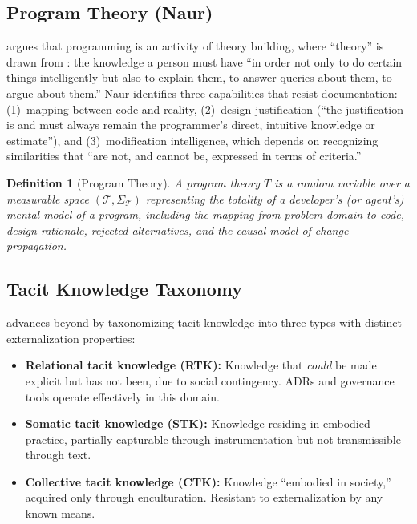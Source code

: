 \documentclass[11pt, a4paper, logo, copyright]{googledeepmind}
\newtheorem{definition}{Definition}[section]
\begin{document}
\subsection{Program Theory (Naur)}

\citet{naur1985} argues that programming is an activity of theory building, where ``theory'' is drawn from \citet{ryle1949}: the knowledge a person must have ``in order not only to do certain things intelligently but also to explain them, to answer queries about them, to argue about them.'' Naur identifies three capabilities that resist documentation: (1)~mapping between code and reality, (2)~design justification (``the justification is and must always remain the programmer's direct, intuitive knowledge or estimate''), and (3)~modification intelligence, which depends on recognizing similarities that ``are not, and cannot be, expressed in terms of criteria.''

\begin{definition}[Program Theory]
\label{def:theory}
A \emph{program theory} $T$ is a random variable over a measurable space $(\mathcal{T}, \Sigma_{\mathcal{T}})$ representing the totality of a developer's (or agent's) mental model of a program, including the mapping from problem domain to code, design rationale, rejected alternatives, and the causal model of change propagation.
\end{definition}

\subsection{Tacit Knowledge Taxonomy}

\citet{collins2010} advances beyond \citet{polanyi1966} by taxonomizing tacit knowledge into three types with distinct externalization properties:

\begin{itemize}
    \item \textbf{Relational tacit knowledge (RTK):} Knowledge that \emph{could} be made explicit but has not been, due to social contingency. ADRs and governance tools operate effectively in this domain.
    \item \textbf{Somatic tacit knowledge (STK):} Knowledge residing in embodied practice, partially capturable through instrumentation but not transmissible through text.
    \item \textbf{Collective tacit knowledge (CTK):} Knowledge ``embodied in society,'' acquired only through enculturation. Resistant to externalization by any known means.
\end{itemize}
\end{document}
